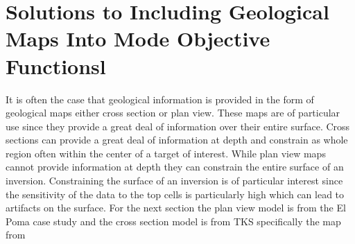 
\chapter{Solutions to Including Geological Maps Into Mode Objective Functionsl }
\label{ch:GIFtools}
%
%
%
%
%
%
%
%	
%
%
%

It is often the case that geological information is provided in the form of geological maps either cross section or plan view. These maps are of particular use since they provide a great deal of information over their entire surface. Cross sections can provide a great deal of information at depth and constrain as whole region often within the center of a target of interest. While plan view maps cannot provide information at depth they can constrain the entire surface of an inversion.  Constraining the surface of an inversion is of particular interest since the sensitivity of the data to the top cells is particularly high which can lead to artifacts on the surface. For the next section the plan view model is from the El Poma case study and the cross section model is from TKS specifically the map from \citep{harder2006geology}

